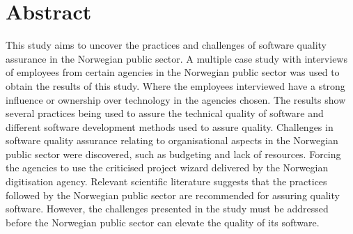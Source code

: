 \chapter*{Abstract}
This study aims to uncover the practices and challenges of software quality assurance in the Norwegian public sector. A multiple case study with interviews of employees from certain agencies in the Norwegian public sector was used to obtain the results of this study. Where the employees interviewed have a strong influence or ownership over technology in the agencies chosen. The results show several practices being used to assure the technical quality of software and different software development methods used to assure quality. Challenges in software quality assurance relating to organisational aspects in the Norwegian public sector were discovered, such as budgeting and lack of resources. Forcing the agencies to use the criticised project wizard delivered by the Norwegian digitisation agency. Relevant scientific literature suggests that the practices followed by the Norwegian public sector are recommended for assuring quality software. However, the challenges presented in the study must be addressed before the Norwegian public sector can elevate the quality of its software.

